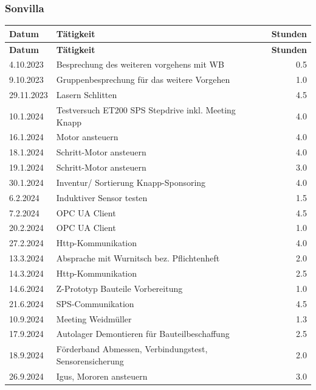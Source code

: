 \subsubsection{Sonvilla}
\begin{longtable}{|l|p{10cm}|r|}
    \hline
    \textbf{Datum} & \textbf{Tätigkeit} & \textbf{Stunden} \\
    \hline
    \endfirsthead

    \hline
    \textbf{Datum} & \textbf{Tätigkeit} & \textbf{Stunden} \\
    \hline
    \endhead

    \hline
    \endfoot

    \hline
    \endlastfoot

    4.10.2023	&	Besprechung des weiteren vorgehens mit WB	&	0.5 \\
    9.10.2023	&	Gruppenbesprechung für das weitere Vorgehen	&	1.0 \\
    29.11.2023	&	Lasern Schlitten	&	4.5 \\
    10.1.2024	&	Testversuch ET200 SPS Stepdrive inkl. Meeting Knapp	&	4.0 \\
    16.1.2024	&	Motor ansteuern	&	4.0 \\
    18.1.2024	&	Schritt-Motor ansteuern	&	4.0 \\
    19.1.2024	&	Schritt-Motor ansteuern	&	3.0 \\
    30.1.2024	&	Inventur/ Sortierung Knapp-Sponsoring	&	4.0 \\
    6.2.2024	&	Induktiver Sensor testen	&	1.5 \\
    7.2.2024	&	OPC UA Client	&	4.5 \\
    20.2.2024	&   OPC UA Client 	&	1.0 \\
    27.2.2024	&	Http-Kommunikation	&	4.0 \\
    13.3.2024	&	Absprache mit Wurnitsch bez. Pflichtenheft	&	2.0 \\
    14.3.2024	&	Http-Kommunikation	&	2.5 \\
    14.6.2024	&	Z-Prototyp Bauteile Vorbereitung	&	1.0 \\
    21.6.2024	&	SPS-Communikation	&	4.5 \\
    10.9.2024	&	Meeting Weidmüller	&	1.3 \\
    17.9.2024	&	Autolager Demontieren für Bauteilbeschaffung	&	2.5 \\
    18.9.2024	&	Förderband Abmessen, Verbindungstest, Sensorensicherung	&	2.0 \\
    26.9.2024	&	Igus, Mororen ansteuern	&	3.0 \\

\end{longtable}

